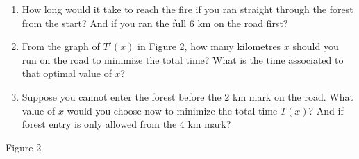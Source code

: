 \documentclass[11pt]{exam}
\begin{document}
\begin{questions}
\begin{minipage}{0.57\textwidth}
\begin{enumerate}[leftmargin=0.5cm,label=(\alph*)]
  \item How long would it take to reach the fire if you ran straight through the forest from the start? And if you ran the full 6 km on the road first?
  \item From the graph of $T'(x)$ in Figure 2, how many kilometres \(x\) should you run on the road to minimize the total time? What is the time associated to that optimal value of $x$?
  \item Suppose you cannot enter the forest before the 2 km mark on the road.  What value of \(x\) would you choose now to minimize the total time $T(x)$? And if forest entry is only allowed from the 4 km mark?
\end{enumerate}
\end{minipage}
\hspace{0.8cm}
\begin{minipage}{0.35\textwidth}
\vspace{-0.1cm}
\begin{center}
\vspace{-0.5cm}

{\small \hspace{1.3cm} Figure 2}
\end{center}
\end{minipage}


\end{questions}
\end{document}
